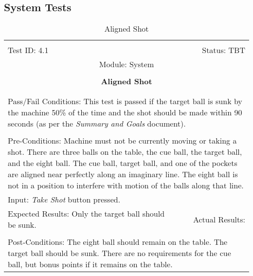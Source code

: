 \documentclass[titlepage]{article}
\begin{document}
\subsection{System Tests}
\begin{center}%
\begin{table}
\begin{tabular}{|l r|}\hline&\\[-2mm]
	Test ID: 4.1	&Status: TBT\\[-3mm]
	\multicolumn{2}{|c|}{Module: System}\\&\\
	\multicolumn{2}{|c|}{\textbf{\large{Aligned Shot}}}\\&\\\hline&\\[-3mm]
	\multicolumn{2}{|p{\textwidth}|}{Pass/Fail Conditions: This test is passed if the target ball is sunk by the machine 50\% of the time and the shot should be made within 90 seconds (as per the \textit{Summary and Goals} document).}\\[1mm]\hline&\\[-3mm]
	\multicolumn{2}{|p{\textwidth}|}{Pre-Conditions: Machine must not be currently moving or taking a shot. There are three balls on the table, the cue ball, the target ball, and the eight ball. The cue ball, target ball, and one of the pockets are aligned near perfectly along an imaginary line. The eight ball is not in a position to interfere with motion of the balls along that line.}\\[4mm]
	\multicolumn{2}{|p{\textwidth}|}{Input: \textit{Take Shot} button pressed.}\\[2mm]\hline
	\multicolumn{1}{|p{0.49\textwidth}}{Expected Results: Only the target ball should be sunk.}	&\multicolumn{1}{|p{0.45\textwidth}|}{Actual Results: }\\\hline&\\[-3mm]
	\multicolumn{2}{|p{\textwidth}|}{Post-Conditions: The eight ball should remain on the table. The target ball should be sunk. There are no requirements for the cue ball, but bonus points if it remains on the table.}\\\hline
\end{tabular}
\caption{Aligned Shot}
\end{table}
\end{center}
\end{document}
